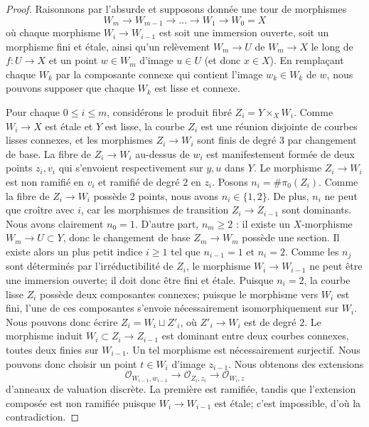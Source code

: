 \begin{proof}
Raisonnons par l'absurde et supposons donnée une tour de morphismes
$$
W_m \to W_{m-1} \to \dots \to W_1 \to W_0 = X
$$
où chaque morphisme $W_i \to W_{i - 1}$ est soit une immersion ouverte, soit un
morphisme fini et \'etale, ainsi qu'un relèvement $W_m \to U$ de $W_m \to X$ le long de
$f : U \to X$ et un point $w \in W_m$ d'image $u \in U$
(et donc $x \in X$). En remplaçant chaque $W_k$ par la composante connexe
qui contient l'image $w_k \in W_k$ de $w$, nous pouvons supposer
que chaque $W_k$ est lisse et connexe.

\medskip\noindent
Pour chaque $0 \le i \le m$, considérons le produit fibré $Z_i = Y \times_X W_i$.
Comme $W_i \to X$ est \'etale et $Y$ est lisse, la courbe $Z_i$ est une réunion
disjointe de courbes lisses connexes, et les morphismes $Z_i \to W_i$ sont finis
de degré $3$ par changement de base. La fibre de $Z_i \to W_i$
au-dessus de $w_i$ est manifestement formée de deux points $z_i, v_i$ qui s'envoient
respectivement sur $y, u$ dans $Y$. Le morphisme $Z_i \to W_i$ est non ramifié en $v_i$
et ramifié de degré $2$ en $z_i$. Posons $n_i = \#\pi_0(Z_i)$. Comme la fibre de
$Z_i \to W_i$ possède $2$ points, nous avons $n_i \in \{1, 2\}$. De plus, $n_i$ ne peut
que croître avec $i$, car les morphismes de transition $Z_i \to Z_{i - 1}$ sont dominants.
Nous avons clairement $n_0 = 1$. D'autre part, $n_m \geq 2$ : il existe un
$X$-morphisme $W_m \to U \subset Y$, donc le changement de base $Z_m \to W_m$
possède une section. Il existe alors un plus petit indice $i \ge 1$ tel que $n_{i - 1} = 1$
et $n_i = 2$. Comme les $n_j$ sont déterminés par l'irréductibilité de $Z_i$,
le morphisme $W_i \to W_{i - 1}$ ne peut être une immersion ouverte;
il doit donc être fini et \'etale. Puisque $n_i = 2$, la courbe lisse $Z_i$
possède deux composantes connexes; puisque le morphisme vers $W_i$ est fini, l'une de
ces composantes s'envoie nécessairement isomorphiquement sur $W_i$.
Nous pouvons donc écrire $Z_i = W_i \sqcup Z'_i$, où $Z'_i \to W_i$ est de degré $2$.
Le morphisme induit $W_i \subset Z_i \to Z_{i - 1}$ est dominant
entre deux courbes connexes, toutes deux finies sur $W_{i - 1}$.
Un tel morphisme est nécessairement surjectif. Nous pouvons donc choisir un point $t \in W_i$
d'image $z_{i - 1}$. Nous obtenons des extensions
$$
\mathcal{O}_{W_{i - 1}, w_{i - 1}} \to
\mathcal{O}_{Z_i, z_i} \to
\mathcal{O}_{W_i, z}
$$
d'anneaux de valuation discrète. La première est ramifiée, tandis que
l'extension composée est non ramifiée puisque $W_i \to W_{i - 1}$ est \'etale; c'est
impossible, d'où la contradiction.
\end{proof}










